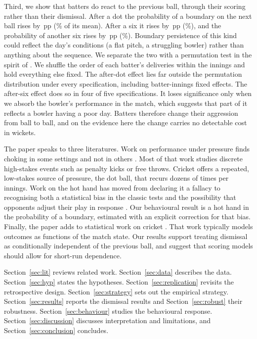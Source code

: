 \documentclass[11pt]{article}
\newcommand{\pp}{\,pp}
\begin{document}
Third, we show that batters do react to the previous ball, through their scoring rather than their dismissal. After a dot the probability of a boundary on the next ball rises by \MBoundaryDot\pp{} (\MBoundaryDotRel\% of its mean). After a six it rises by \MBoundarySix\pp{} (\MBoundarySixRel\%), and the probability of another six rises by \MSixSix\pp{} (\MSixSixRel\%). Boundary persistence of this kind could reflect the day's conditions (a flat pitch, a struggling bowler) rather than anything about the sequence. We separate the two with a permutation test in the spirit of \citet{miller2018surprised}. We shuffle the order of each batter's deliveries within the innings and hold everything else fixed. The after-dot effect lies far outside the permutation distribution under every specification, including batter-innings fixed effects. The after-six effect does so in four of five specifications. It loses significance only when we absorb the bowler's performance in the match, which suggests that part of it reflects a bowler having a poor day. Batters therefore change their aggression from ball to ball, and on the evidence here the change carries no detectable cost in wickets.

The paper speaks to three literatures. Work on performance under pressure finds choking in some settings and not in others \citep{dohmen2008professionals,apesteguia2010psychological,cao2011performance,gonzalezdiaz2012performing}. Most of that work studies discrete high-stakes events such as penalty kicks or free throws. Cricket offers a repeated, low-stakes source of pressure, the dot ball, that recurs dozens of times per innings. Work on the hot hand has moved from declaring it a fallacy \citep{gilovich1985hot} to recognising both a statistical bias in the classic tests \citep{miller2018surprised} and the possibility that opponents adjust their play in response \citep{green2018hot}. Our behavioural result is a hot hand in the probability of a boundary, estimated with an explicit correction for that bias. Finally, the paper adds to statistical work on cricket \citep{duckworth1998fair,swartz2009modelling,davis2015simulator}. That work typically models outcomes as functions of the match state. Our results support treating dismissal as conditionally independent of the previous ball, and suggest that scoring models should allow for short-run dependence.

Section~\ref{sec:lit} reviews related work. Section~\ref{sec:data} describes the data. Section~\ref{sec:hyp} states the hypotheses. Section~\ref{sec:replication} revisits the retrospective design. Section~\ref{sec:strategy} sets out the empirical strategy. Section~\ref{sec:results} reports the dismissal results and Section~\ref{sec:robust} their robustness. Section~\ref{sec:behaviour} studies the behavioural response. Section~\ref{sec:discussion} discusses interpretation and limitations, and Section~\ref{sec:conclusion} concludes.
\end{document}
